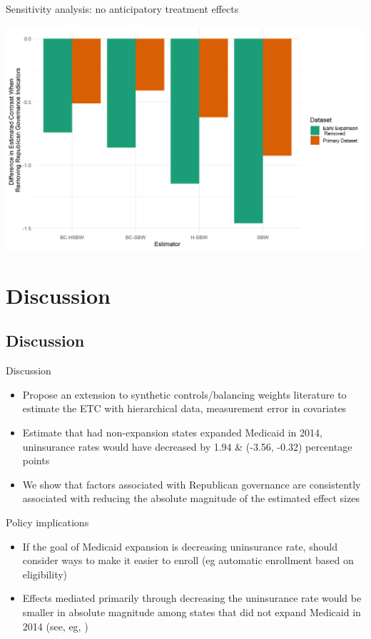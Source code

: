 \documentclass[hyperref={pdfpagelabels=false}]{beamer}
\begin{document}
\begin{frame}{Sensitivity analysis: no anticipatory treatment effects}
    \begin{center}
	\includegraphics[scale=0.5]{01_Plots/repub-diff-c1c2.png}
    \end{center}
\end{frame}

\section{Discussion}

\subsection{Discussion}

\begin{frame}{Discussion}
\begin{itemize}
    \item Propose an extension to synthetic controls/balancing weights literature to estimate the ETC with hierarchical data, measurement error in covariates \bigskip
    \item Estimate that had non-expansion states expanded Medicaid in 2014, uninsurance rates would have decreased by 1.94 & (-3.56, -0.32) percentage points \bigskip
    \item We show that factors associated with Republican governance are consistently associated with reducing the absolute magnitude of the estimated effect sizes
\end{itemize}
\end{frame}

\begin{frame}{Policy implications}
    \begin{itemize}
        \item If the goal of Medicaid expansion is decreasing uninsurance rate, should consider ways to make it easier to enroll (eg automatic enrollment based on eligibility) \bigskip
        \item Effects mediated primarily through decreasing the uninsurance rate would be smaller in absolute magnitude among states that did not expand Medicaid in 2014 (see, eg, \cite{wherry2016early}) \bigskip
    \end{itemize}
\end{frame}
\end{document}
